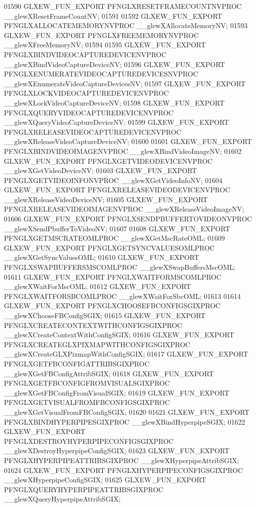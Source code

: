 \begin{DoxyCode}
01590 GLXEW_FUN_EXPORT PFNGLXRESETFRAMECOUNTNVPROC __glewXResetFrameCountNV;
01591 
01592 GLXEW_FUN_EXPORT PFNGLXALLOCATEMEMORYNVPROC __glewXAllocateMemoryNV;
01593 GLXEW_FUN_EXPORT PFNGLXFREEMEMORYNVPROC __glewXFreeMemoryNV;
01594 
01595 GLXEW_FUN_EXPORT PFNGLXBINDVIDEOCAPTUREDEVICENVPROC 
      __glewXBindVideoCaptureDeviceNV;
01596 GLXEW_FUN_EXPORT PFNGLXENUMERATEVIDEOCAPTUREDEVICESNVPROC 
      __glewXEnumerateVideoCaptureDevicesNV;
01597 GLXEW_FUN_EXPORT PFNGLXLOCKVIDEOCAPTUREDEVICENVPROC 
      __glewXLockVideoCaptureDeviceNV;
01598 GLXEW_FUN_EXPORT PFNGLXQUERYVIDEOCAPTUREDEVICENVPROC 
      __glewXQueryVideoCaptureDeviceNV;
01599 GLXEW_FUN_EXPORT PFNGLXRELEASEVIDEOCAPTUREDEVICENVPROC 
      __glewXReleaseVideoCaptureDeviceNV;
01600 
01601 GLXEW_FUN_EXPORT PFNGLXBINDVIDEOIMAGENVPROC __glewXBindVideoImageNV;
01602 GLXEW_FUN_EXPORT PFNGLXGETVIDEODEVICENVPROC __glewXGetVideoDeviceNV;
01603 GLXEW_FUN_EXPORT PFNGLXGETVIDEOINFONVPROC __glewXGetVideoInfoNV;
01604 GLXEW_FUN_EXPORT PFNGLXRELEASEVIDEODEVICENVPROC __glewXReleaseVideoDeviceNV;
01605 GLXEW_FUN_EXPORT PFNGLXRELEASEVIDEOIMAGENVPROC __glewXReleaseVideoImageNV;
01606 GLXEW_FUN_EXPORT PFNGLXSENDPBUFFERTOVIDEONVPROC __glewXSendPbufferToVideoNV;
01607 
01608 GLXEW_FUN_EXPORT PFNGLXGETMSCRATEOMLPROC __glewXGetMscRateOML;
01609 GLXEW_FUN_EXPORT PFNGLXGETSYNCVALUESOMLPROC __glewXGetSyncValuesOML;
01610 GLXEW_FUN_EXPORT PFNGLXSWAPBUFFERSMSCOMLPROC __glewXSwapBuffersMscOML;
01611 GLXEW_FUN_EXPORT PFNGLXWAITFORMSCOMLPROC __glewXWaitForMscOML;
01612 GLXEW_FUN_EXPORT PFNGLXWAITFORSBCOMLPROC __glewXWaitForSbcOML;
01613 
01614 GLXEW_FUN_EXPORT PFNGLXCHOOSEFBCONFIGSGIXPROC __glewXChooseFBConfigSGIX;
01615 GLXEW_FUN_EXPORT PFNGLXCREATECONTEXTWITHCONFIGSGIXPROC 
      __glewXCreateContextWithConfigSGIX;
01616 GLXEW_FUN_EXPORT PFNGLXCREATEGLXPIXMAPWITHCONFIGSGIXPROC 
      __glewXCreateGLXPixmapWithConfigSGIX;
01617 GLXEW_FUN_EXPORT PFNGLXGETFBCONFIGATTRIBSGIXPROC __glewXGetFBConfigAttribSGIX;
01618 GLXEW_FUN_EXPORT PFNGLXGETFBCONFIGFROMVISUALSGIXPROC 
      __glewXGetFBConfigFromVisualSGIX;
01619 GLXEW_FUN_EXPORT PFNGLXGETVISUALFROMFBCONFIGSGIXPROC 
      __glewXGetVisualFromFBConfigSGIX;
01620 
01621 GLXEW_FUN_EXPORT PFNGLXBINDHYPERPIPESGIXPROC __glewXBindHyperpipeSGIX;
01622 GLXEW_FUN_EXPORT PFNGLXDESTROYHYPERPIPECONFIGSGIXPROC 
      __glewXDestroyHyperpipeConfigSGIX;
01623 GLXEW_FUN_EXPORT PFNGLXHYPERPIPEATTRIBSGIXPROC __glewXHyperpipeAttribSGIX;
01624 GLXEW_FUN_EXPORT PFNGLXHYPERPIPECONFIGSGIXPROC __glewXHyperpipeConfigSGIX;
01625 GLXEW_FUN_EXPORT PFNGLXQUERYHYPERPIPEATTRIBSGIXPROC 
      __glewXQueryHyperpipeAttribSGIX;

\end{DoxyCode}
